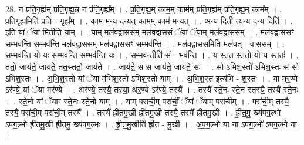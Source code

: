 \documentclass[17pt]{extarticle}
\begin{document}
28. न प्र॑ति॒गृह्य॑म् प्रति॒गृह्य॒न्न न प्र॑ति॒गृह्य᳚म् । . प्र॒ति॒गृह्य॒म् काम॒म् काम॑म् प्रति॒गृह्य॑म् प्रति॒गृह्य॒म् काम᳚म् । . प्र॒ति॒गृह्य॒मिति॑ प्रति - गृह्य᳚म् । . काम॑ म॒न्य द॒न्यत् काम॒म् काम॑ म॒न्यत् । . अ॒न्य दिती त्य॒न्य द॒न्य दिति॑ । . इति॒ यां ॅया मितीति॒ याम् । . याम् मल॑वद्वासस॒म् मल॑वद्वाससं॒ ॅयां ॅयाम् मल॑वद्वाससम् । . मल॑वद्वाससꣳ स॒म्भव॑न्ति स॒म्भव॑न्ति॒ मल॑वद्वासस॒म् मल॑वद्वाससꣳ स॒म्भव॑न्ति । . मल॑वद्वासस॒मिति॒ मल॑वत् - वा॒स॒स॒म् । . स॒म्भव॑न्ति॒ यो यः स॒म्भव॑न्ति स॒म्भव॑न्ति॒ यः । . स॒म्भव॒न्तीति॑ सं - भव॑न्ति । . य स्तत॒ स्ततो॒ यो य स्ततः॑ । . ततो॒ जाय॑ते॒ जाय॑ते॒ तत॒स्ततो॒ जाय॑ते । . जाय॑ते॒ स स जाय॑ते॒ जाय॑ते॒ सः । . सो॑ ऽभिश॒स्तो॑ ऽभिश॒स्तः स सो॑ ऽभिश॒स्तः । . अ॒भि॒श॒स्तो यां ॅया म॑भिश॒स्तो॑ ऽभिश॒स्तो याम् । . अ॒भि॒श॒स्त इत्य॑भि - श॒स्तः । . या मर॒ण्ये ऽर॑ण्ये॒ यां ॅया मर॑ण्ये । . अर॑ण्ये॒ तस्यै॒ तस्या॒ अर॒ण्ये ऽर॑ण्ये॒ तस्यै᳚ । . तस्यै᳚ स्ते॒नः स्ते॒न स्तस्यै॒ तस्यै᳚ स्ते॒नः । . स्ते॒नो यां ॅयाꣳ स्ते॒नः स्ते॒नो याम् । . याम् परा॑ची॒म् परा॑चीं॒ ॅयां ॅयाम् परा॑चीम् । . परा॑ची॒म् तस्यै॒ तस्यै॒ परा॑ची॒म् परा॑ची॒म् तस्यै᳚ । . तस्यै᳚ ह्रीतमु॒खी ह्री॑तमु॒खी तस्यै॒ तस्यै᳚ ह्रीतमु॒खी । . ह्री॒त॒मु॒ ख्य॑पग॒ल्भो॑ ऽपग॒ल्भो ह्री॑तमु॒खी ह्री॑तमु॒ ख्य॑पग॒ल्भः । . ह्री॒त॒मु॒खीति॑ ह्रीत - मु॒खी । . अ॒प॒ग॒ल्भो या या ऽप॑ग॒ल्भो॑ ऽपग॒ल्भो या । \newline
\end{document}
